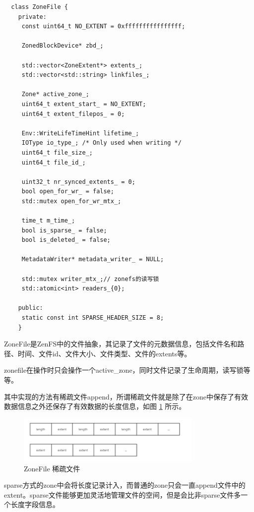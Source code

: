 \begin{lstlisting}
  class ZoneFile {
    private:
     const uint64_t NO_EXTENT = 0xffffffffffffffff;
   
     ZonedBlockDevice* zbd_;
   
     std::vector<ZoneExtent*> extents_;
     std::vector<std::string> linkfiles_;
   
     Zone* active_zone_;
     uint64_t extent_start_ = NO_EXTENT;
     uint64_t extent_filepos_ = 0;
   
     Env::WriteLifeTimeHint lifetime_;
     IOType io_type_; /* Only used when writing */
     uint64_t file_size_;
     uint64_t file_id_;
   
     uint32_t nr_synced_extents_ = 0;
     bool open_for_wr_ = false;
     std::mutex open_for_wr_mtx_;
   
     time_t m_time_;
     bool is_sparse_ = false;
     bool is_deleted_ = false;
   
     MetadataWriter* metadata_writer_ = NULL;
   
     std::mutex writer_mtx_;// zonefs的读写锁
     std::atomic<int> readers_{0};
   
    public:
     static const int SPARSE_HEADER_SIZE = 8;
    }   
\end{lstlisting}

ZoneFile是ZenFS中的文件抽象，其记录了文件的元数据信息，包括文件名和路径、时间、文件id、文件大小、文件类型、文件的extents等。

zonefile在操作时只会操作一个active\_zone，同时文件记录了生命周期，读写锁等等。

其中实现的方法有稀疏文件append，所谓稀疏文件就是除了在zone中保存了有效数据信息之外还保存了有效数据的长度信息，如图 \ref{sparse-zone} 所示。

\begin{figure}[htbp]
  \centering
  \includegraphics[width=0.8\textwidth]{fig/sparse_zone}
  \caption{ZoneFile 稀疏文件}
  \label{sparse-zone}
\end{figure}

sparse方式的zone中会将长度记录计入，而普通的zone只会一直append文件中的extent。sparse文件能够更加灵活地管理文件的空间，但是会比非sparse文件多一个长度字段信息。

